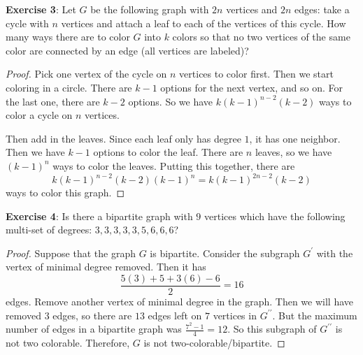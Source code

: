 \documentclass{article}
\begin{document}
\textbf{Exercise 3}: Let $G$ be the following graph with $2n$ vertices and $2n$ edges: take a cycle with $n$ vertices and attach a leaf to each of the vertices of this cycle. How many ways there are to color $G$ into $k$ colors so that no two vertices of the same color are connected by an edge (all vertices are labeled)?
    \begin{proof}
        Pick one vertex of the cycle on $n$ vertices to color first. Then we start coloring in a circle. There are $k - 1$ options for the next vertex, and so on. For the last one, there are $k - 2$ options. So we have $k(k - 1)^{n - 2}(k - 2)$ ways to color a cycle on $n$ vertices.

        Then add in the leaves. Since each leaf only has degree $1$, it has one neighbor. Then we have $k - 1$ options to color the leaf. There are $n$ leaves, so we have $(k - 1)^{n}$ ways to color the leaves. Putting this together, there are 
            \begin{equation*}
                k(k - 1)^{n - 2}(k - 2)(k - 1)^{n} = k(k - 1)^{2n - 2}(k - 2)
            \end{equation*}
        ways to color this graph.
    \end{proof}

\textbf{Exercise 4}: Is there a bipartite graph with $9$ vertices which have the following multi-set of degrees: $3, 3, 3, 3, 3, 5, 6, 6, 6$?
    \begin{proof}
        Suppose that the graph $G$ is bipartite. Consider the subgraph $G^{\prime}$ with the vertex of minimal degree removed. Then it has
            \begin{equation*}
                \dfrac{5(3) + 5 + 3(6) - 6}{2} = 16
            \end{equation*}
        edges. Remove another vertex of minimal degree in the graph. Then we will have removed $3$ edges, so there are $13$ edges left on $7$ vertices in $G^{\prime\prime}$. But the maximum number of edges in a bipartite graph was $\frac{7^{2} - 1}{4} = 12$. So this subgraph of $G^{\prime\prime}$ is not two colorable. Therefore, $G$ is not two-colorable/bipartite.
    \end{proof}
\end{document}
